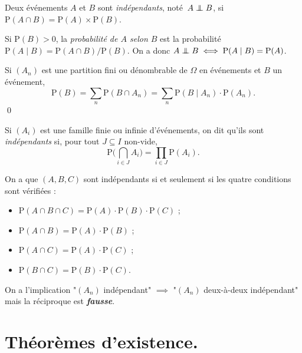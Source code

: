 \documentclass[./main]{subfiles}
\begin{document}
  \begin{defn}
    Deux événements $A$ et $B$ sont \textit{indépendants}, noté~$A \perp\!\!\!\!\!\:\perp B$, si $\mathrm{P}(A \cap B) = \mathrm{P}(A) \times \mathrm{P}(B)$.
  \end{defn}

  \begin{defn}
    Si $\mathrm{P}(B) > 0$, la \textit{probabilité de $A$ selon $B$} est la probabilité $\mathrm{P}(A  \mid B) = \mathrm{P}(A \cap B) / \mathrm{P}(B)$.
    On a donc $A \perp\!\!\!\!\!\:\perp B \iff \mathrm{P}(A  \mid B) = \mathrm{P}(A)$.
  \end{defn}

  \begin{lem}
    Si $(A_n)$ est une partition fini ou dénombrable de $\Omega$ en événements et $B$ un événement, 
    \[
    \mathrm{P}(B) = \sum_{n} \mathrm{P}(B \cap A_n) = \sum_{n} \mathrm{P}(B  \mid A_n) \cdot \mathrm{P}(A_n)
    .\] \qed
  \end{lem}

  \begin{defn}
    Si $(A_i)$ est une famille finie ou infinie d'événements, on dit qu'ils sont  \textit{indépendants} si, pour tout $J \subseteq I$ non-vide, \[
    \mathrm{P}\Big( \bigcap_{i \in J} A_i\Big) = \prod_{i \in J} \mathrm{P}(A_i)
    .\] 
  \end{defn}

  \begin{exm}
    On a que $(A, B, C)$ sont indépendants si et seulement si les quatre conditions sont vérifiées :
    \begin{itemize}
      \item $\mathrm{P}(A \cap B \cap C) = \mathrm{P}(A) \cdot \mathrm{P}(B) \cdot \mathrm{P}(C)$ ;
      \item $\mathrm{P}(A \cap B) = \mathrm{P}(A) \cdot \mathrm{P}(B)$ ;
      \item $\mathrm{P}(A \cap C) = \mathrm{P}(A) \cdot \mathrm{P}(C)$ ;
      \item $\mathrm{P}(B \cap C) = \mathrm{P}(B) \cdot \mathrm{P}(C)$.
    \end{itemize}
  \end{exm}

  \begin{rmk}
    On a l'implication "$(A_n)$ indépendant" $\implies$ "$(A_n)$ deux-à-deux indépendant"
    mais la réciproque est \textit{\textbf{fausse}}.
  \end{rmk}

  \section{Théorèmes d'existence.}
\end{document}
